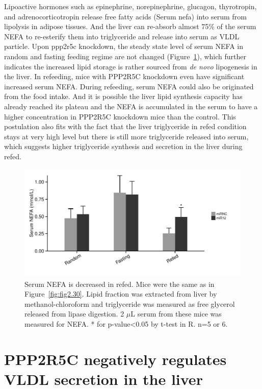 Lipoactive hormones such as epinephrine, norepinephrine, glucagon, thyrotropin, and adrenocorticotropin release free fatty acids (Serum \gls{nefa}) into serum from lipolysis in adipose tissues. And the liver can re-absorb almost 75\% of the serum NEFA to re-esterify them into triglyceride and release into serum as VLDL particle. Upon \gls{ppp2r5c} knockdown, the steady state level of serum NEFA in random and fasting feeding regime are not changed (Figure~\ref{fig:fig2.34}), which further indicates the increased lipid storage is rather sourced from \textit{de novo} lipogenesis in the liver. In refeeding, mice with PPP2R5C knockdown even have significant increased serum NEFA. During refeeding, serum NEFA could also be originated from the food intake. And it is possible the liver lipid synthesis capacity has already reached its plateau and the NEFA is accumulated in the serum to have a higher concentration in PPP2R5C knockdown mice than the control. This postulation also fits with the fact that the liver triglyceride in refed condition stays at very high level but there is still more triglyceride released into serum, which suggests higher triglyceride synthesis and secretion in the liver during refed.

\begin{figure}[htbp]
\centering
\includegraphics[width=1\textwidth]{figs/fig2-34 serum NEFA.pdf}
\caption[Serum NEFA changes in refed]{\footnotesize Serum NEFA is decreased in refed. Mice were the same as in Figure~\ref{fig:fig2.30}. Lipid fraction was extracted from liver by methanol-chloroform and triglyceride was measured as free glycerol released from lipase digestion. 2 $\mu$L serum from these mice was measured for NEFA. * for p-value<0.05 by t-test in R. n=5 or 6.}
\label{fig:fig2.34}
\end{figure}


\section{PPP2R5C negatively regulates VLDL secretion in the liver}

